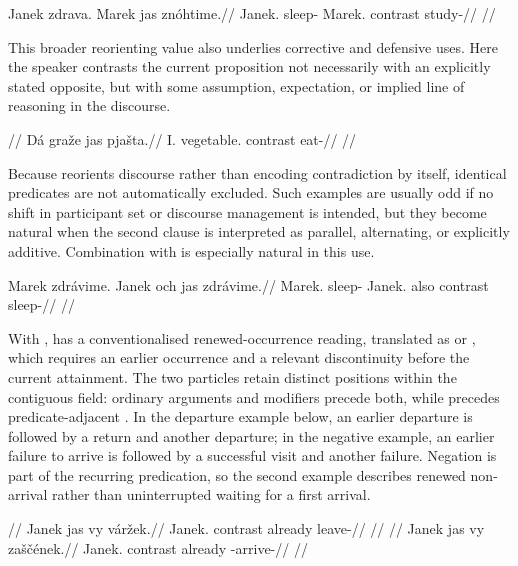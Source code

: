 \pex
\begingl
\gla Janek zdrava. Marek jas znóhtime.//
\glb Janek.\Dir{} sleep-\Cont{} Marek.\Dir{} contrast study-\Prog{}//
\glft {}//
\endgl
\xe

This broader reorienting value also underlies corrective and defensive uses.
Here the speaker contrasts the current proposition not necessarily with an
explicitly stated opposite, but with some assumption, expectation, or implied
line of reasoning in the discourse.

\pex
\begingl
\glpreamble {}//
\gla Dá graže jas pjašta.//
\glb I.\Dir{} vegetable.\Ind{} contrast eat-\Cont{}//
\glft {}//
\endgl
\xe

Because  reorients discourse rather than encoding contradiction by
itself, identical predicates are not automatically excluded. Such examples are
usually odd if no shift in participant set or discourse management is intended,
but they become natural when the second clause is interpreted as parallel,
alternating, or explicitly additive. Combination with  is especially
natural in this use.

\pex
\begingl
\gla Marek zdrávime. Janek och jas zdrávime.//
\glb Marek.\Dir{} sleep-\Prog{} Janek.\Dir{} also contrast sleep-\Prog{}//
\glft {}//
\endgl
\xe

With ,  has a conventionalised renewed-occurrence reading,
translated as  or , which requires an earlier
occurrence and a relevant discontinuity before the current attainment.
The two particles retain distinct positions within the contiguous field:
ordinary arguments and modifiers precede both, while  precedes
predicate-adjacent . In the departure example below, an earlier
departure is followed by a return and another departure; in the negative
example, an earlier failure to arrive is followed by a successful visit and
another failure. Negation is part of the recurring predication, so the
second example describes renewed non-arrival rather than uninterrupted
waiting for a first arrival.

\pex
\a
\begingl
\glpreamble {}//
\gla Janek jas vy váržek.//
\glb Janek.\Dir{} contrast already leave-\Pf{}//
\glft {}//
\endgl
\a
\begingl
\glpreamble {}//
\gla Janek jas vy zaščének.//
\glb Janek.\Dir{} contrast already \Neg{}-arrive-\Pf{}//
\glft {}//
\endgl
\xe

